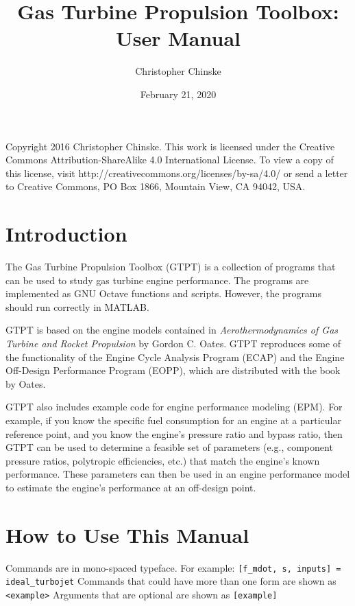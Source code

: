 \documentclass{article}
\begin{document}
\title{Gas Turbine Propulsion Toolbox: User Manual}
\author{Christopher Chinske}
\date{February 21, 2020}
\maketitle

Copyright 2016 Christopher Chinske.  This work is licensed under the
Creative Commons Attribution-ShareAlike 4.0 International License. To
view a copy of this license, visit
http://creativecommons.org/licenses/by-sa/4.0/ or send a letter to
Creative Commons, PO Box 1866, Mountain View, CA 94042, USA.

\section{Introduction}
The Gas Turbine Propulsion Toolbox (GTPT) is a collection of programs
that can be used to study gas turbine engine performance.  The
programs are implemented as GNU Octave functions and scripts.
However, the programs should run correctly in MATLAB.

GTPT is based on the engine models contained in
\emph{Aerothermodynamics of Gas Turbine and Rocket Propulsion} by
Gordon C. Oates.  GTPT reproduces some of the functionality of the
Engine Cycle Analysis Program (ECAP) and the Engine Off-Design
Performance Program (EOPP), which are distributed with the book by
Oates.

GTPT also includes example code for engine performance modeling (EPM).
For example, if you know the specific fuel consumption for an engine
at a particular reference point, and you know the engine’s pressure
ratio and bypass ratio, then GTPT can be used to determine a feasible
set of parameters (e.g., component pressure ratios, polytropic
efficiencies, etc.) that match the engine’s known performance.  These
parameters can then be used in an engine performance model to estimate
the engine’s performance at an off-design point.

\section{How to Use This Manual}
Commands are in mono-spaced typeface.  For example:
\newline
\newline
\texttt{[f\_mdot, s, inputs] = ideal\_turbojet}
\newline
\newline
Commands that could have more than one form are shown as \texttt{<example>}
\newline
Arguments that are optional are shown as \texttt{[example]}
\end{document}
